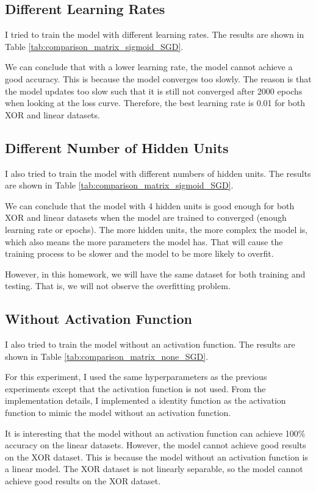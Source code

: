 \subsection{Different Learning Rates}
\label{sec:discussion_learning_rate}

I tried to train the model with different learning rates.
The results are shown in Table \ref{tab:comparison_matrix_sigmoid_SGD}.

We can conclude that with a lower learning rate, the model cannot achieve a good accuracy.
This is because the model converges too slowly.
The reason is that the model updates too slow such that it is still not converged after 2000 epochs when looking at the loss curve.
Therefore, the best learning rate is 0.01 for both XOR and linear datasets.

\subsection{Different Number of Hidden Units}

I also tried to train the model with different numbers of hidden units.
The results are shown in Table \ref{tab:comparison_matrix_sigmoid_SGD}.

We can conclude that the model with 4 hidden units is good enough for both XOR and linear datasets when the model are trained to converged (enough learning rate or epochs).
The more hidden units, the more complex the model is, which also means the more parameters the model has.
That will cause the training process to be slower and the model to be more likely to overfit.

However, in this homework, we will have the same dataset for both training and testing.
That is, we will not observe the overfitting problem.

\subsection{Without Activation Function}
\label{sec:discussion_without_activation_function}

I also tried to train the model without an activation function.
The results are shown in Table \ref{tab:comparison_matrix_none_SGD}.


For this experiment, I used the same hyperparameters as the previous experiments except that the activation function is not used.
From the implementation details, I implemented a identity function as the activation function to mimic the model without an activation function.

It is interesting that the model without an activation function can achieve 100\% accuracy on the linear datasets.
However, the model cannot achieve good results on the XOR dataset.
This is because the model without an activation function is a linear model.
The XOR dataset is not linearly separable, so the model cannot achieve good results on the XOR dataset.

